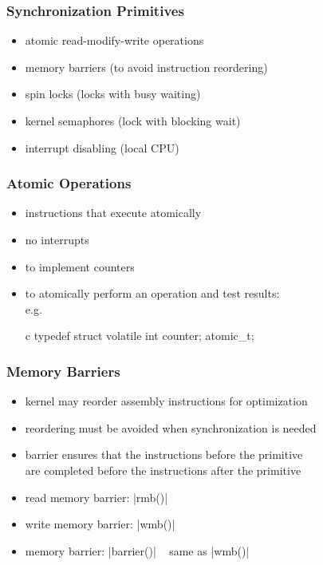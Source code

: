 \documentclass[dvipsnames]{beamer}
\begin{document}
\begin{frame}
  \frametitle{Synchronization Primitives}

  \begin{itemize}
    \item atomic read-modify-write operations
    \item memory barriers (to avoid instruction reordering)
    \item spin locks (locks with busy waiting)
    \item kernel semaphores (lock with blocking wait)
    \item interrupt disabling (local CPU)
  \end{itemize}
\end{frame}

\begin{frame}[fragile]
  \frametitle{Atomic Operations}

  \begin{itemize}
    \item instructions that execute atomically
    \item no interrupts

    \medskip
    \item to implement counters
    \item to atomically perform an operation and test results:\\
      e.g. 

    \medskip
    \begin{pygments}{c}
typedef struct {
    volatile int counter;
} atomic_t;
    \end{pygments}
  \end{itemize}
\end{frame}

\begin{frame}
  \frametitle{Memory Barriers}

  \begin{itemize}
    \item kernel may reorder assembly instructions for optimization
    \item reordering must be avoided when synchronization is needed
    \item barrier ensures that the instructions before the primitive\\
      are completed before the instructions after the primitive

    \medskip
    \item read memory barrier: |rmb()|
    \item write memory barrier: |wmb()|
    \item memory barrier: |barrier()|
      \textendash ~ same as |wmb()|
  \end{itemize}
\end{frame}
\end{document}
